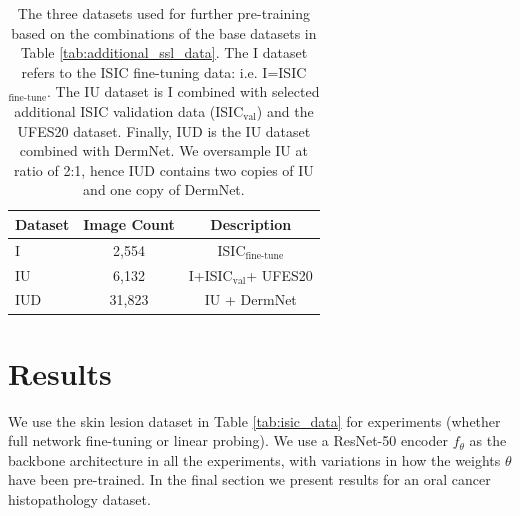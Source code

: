 \documentclass[a4paper,fleqn]{cas-dc}
\begin{document}
\begin{table}[htbp!]
\centering
\begin{tabular}{@{}lcc@{}}
\toprule
\textbf{Dataset} & \textbf{Image Count} & \textbf{Description} \\ \midrule
I                & 2,554 &   ISIC$_{\text{fine-tune}}$  
\\
IU               & 6,132       & I+ISIC$_{\text{val}}$+ UFES20 \\ 
IUD              & 31,823      & IU + DermNet   \\ \bottomrule
\end{tabular}
\caption{The three datasets used for further pre-training based on the  combinations of the base datasets in Table \ref{tab:additional_ssl_data}. The I dataset refers to  the ISIC fine-tuning data: i.e. I=ISIC$_{\text{fine-tune}}$. The IU dataset is I combined with selected additional ISIC validation data (ISIC$_{\text{val}}$) and the UFES20 dataset. Finally, IUD is the IU dataset combined with  DermNet. We oversample IU at ratio of 2:1, hence IUD contains two copies of IU and one copy of DermNet.}
\label{tab:combined_additional_ssl_data}
\end{table}

 
\section{Results}
\label{sec:results}



We use the skin lesion dataset in Table \ref{tab:isic_data} for experiments (whether full network fine-tuning or linear probing). We use a ResNet-50 encoder $f_{\theta}$ as the backbone architecture in all the experiments, with variations in how the weights $\theta$ have been pre-trained. In the final section we present results for an oral cancer histopathology dataset.
\end{document}
